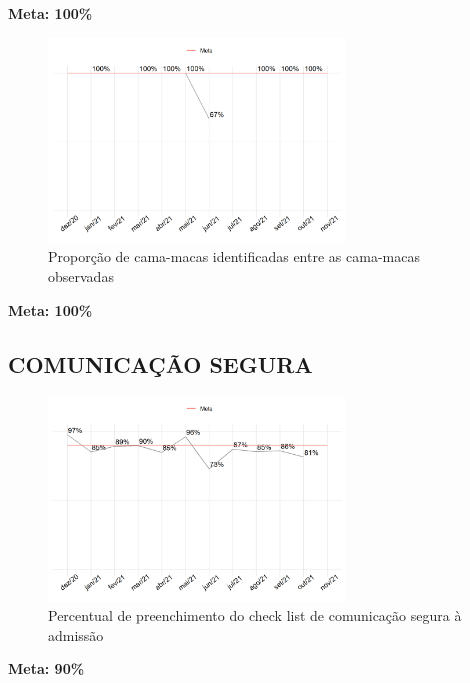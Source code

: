 \documentclass[
  a4paper]{article}
\begin{document}
\begin{center}
 \textbf{Meta: 100\%}
\end{center}

\begin{figure}[H]
\caption{Proporção de cama-macas identificadas entre as cama-macas observadas}
\includegraphics[width=0.7\textwidth]{Imagens/cama.png}
\end{figure}

\begin{center}
 \textbf{Meta: 100\%}
\end{center}

\subsection{COMUNICAÇÃO SEGURA}

\begin{figure}[H]
\caption{Percentual de preenchimento do check list de comunicação segura à admissão}
\includegraphics[width=0.7\textwidth]{Imagens/check_admissao.png}
\end{figure}

\begin{center}
 \textbf{Meta: 90\%}
\end{center}
\end{document}
